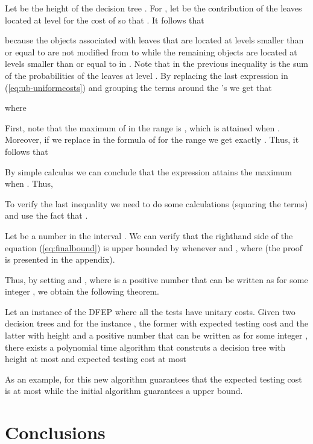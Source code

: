 \documentclass{llncs}
\begin{document}
Let  be the height
of the decision tree .
For , let 
   be the contribution of the leaves located at  level  for
  the cost of  so that .
  It follows that 
 
because the objects associated with leaves that are located at levels smaller than
or equal to  are not modified from  to   while the remaining objects are located at levels
smaller than or equal to  in . Note that  in the previous inequality is the sum of the probabilities
of the leaves at level .
By replacing the last
expression in (\ref{eq:ub-uniformcosts}) and
grouping the terms around the 's we get that 





where

 




First, note that the maximum of  in the range  is
, which is attained when .
Moreover, if we replace  in the formula 
of  for  the range  we get exactly 
. Thus, 
it follows that 

By simple calculus we can conclude that the expression attains 
the maximum when .
Thus,




To verify the last  inequality we need
to do some calculations (squaring the terms) and use the fact that  .

Let  be a number in the interval
.
We can verify that
the righthand side of the  equation (\ref{eq:finalbound}) is upper bounded
by  
whenever     and , where  (the proof is presented in the appendix). 

Thus, by setting      and
, where
  is a positive number that can be written as 
for some integer ,
we obtain  the following theorem.


\begin{theorem}
Let 
an instance of the DFEP where all the tests have unitary  costs.
Given  two decision trees  and  for the instance ,
 the former  with expected testing cost   and the latter with height   and a positive number  that
can be written as  for some integer , there exists
 a polynomial time algorithm that construts a  decision tree  with  height at most 
 and  expected testing cost at most  
 \end{theorem}

As an  example, for  this new algorithm guarantees that the 
expected testing cost is at most  while
the initial algorithm guarantees a  upper bound.

\section{Conclusions}
\end{document}
